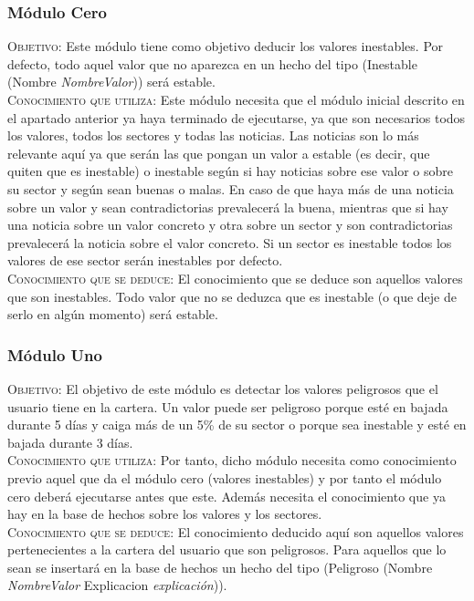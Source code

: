 \documentclass[12pt]{article}
\begin{document}
\subsubsection{Módulo Cero}
\textsc{Objetivo}: Este módulo tiene como objetivo deducir los valores inestables. Por defecto, todo aquel valor que no aparezca en un hecho del tipo (Inestable (Nombre \textit{NombreValor})) será estable.\\

\textsc{Conocimiento que utiliza}: Este módulo necesita que el módulo inicial descrito en el apartado anterior ya haya terminado de ejecutarse, ya que son necesarios todos los valores, todos los sectores y todas las noticias. Las noticias son lo más relevante aquí ya que serán las que pongan un valor a estable (es decir, que quiten que es inestable) o inestable según si hay noticias sobre ese valor o sobre su sector y según sean buenas o malas. En caso de que haya más de una noticia sobre un valor y sean contradictorias prevalecerá la buena, mientras que si hay una noticia sobre un valor concreto y otra sobre un sector y son contradictorias prevalecerá la noticia sobre el valor concreto. Si un sector es inestable todos los valores de ese sector serán inestables por defecto. \\

\textsc{Conocimiento que se deduce}: El conocimiento que se deduce son aquellos valores que son inestables. Todo valor que no se deduzca que es inestable (o que deje de serlo en algún momento) será estable.

\subsubsection{Módulo Uno}
\textsc{Objetivo}: El objetivo de este módulo es detectar los valores peligrosos que el usuario tiene en la cartera. Un valor puede ser peligroso porque esté en bajada durante 5 días y caiga más de un 5\% de su sector o porque sea inestable y esté en bajada durante 3 días. \\

\textsc{Conocimiento que utiliza}: Por tanto, dicho módulo necesita como conocimiento previo aquel que da el módulo cero (valores inestables) y por tanto el módulo cero deberá ejecutarse antes que este. Además necesita el conocimiento que ya hay en la base de hechos sobre los valores y los sectores.\\

\textsc{Conocimiento que se deduce}: El conocimiento deducido aquí son aquellos valores pertenecientes a la cartera del usuario que son peligrosos. Para aquellos que lo sean se insertará en la base de hechos un hecho del tipo (Peligroso (Nombre \textit{NombreValor} Explicacion \textit{explicación})).
\end{document}
